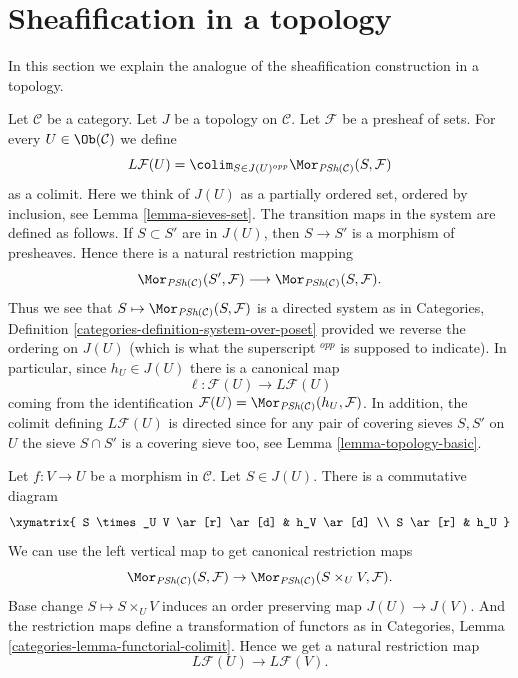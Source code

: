 \section{Sheafification in a topology}
\label{section-sheafification-topology}

\noindent
In this section we explain the analogue of the
sheafification construction in a topology.

\medskip\noindent
Let $\mathcal{C}$ be a category.
Let $J$ be a topology on $\mathcal{C}$.
Let $\mathcal{F}$ be a presheaf of sets.
For every $U \in \Ob(\mathcal{C})$ we
define
$$
L\mathcal{F}(U)
=
\colim_{S \in J(U)^{opp}}
\Mor_{\textit{PSh}(\mathcal{C})}(S, \mathcal{F})
$$
as a colimit. Here we think of $J(U)$ as a partially ordered set,
ordered by inclusion, see Lemma \ref{lemma-sieves-set}. The transition
maps in the system are defined as follows.
If $S \subset S'$ are in $J(U)$, then $S \to S'$ is
a morphism of presheaves. Hence there is a natural restriction
mapping
$$
\Mor_{\textit{PSh}(\mathcal{C})}(S', \mathcal{F})
\longrightarrow
\Mor_{\textit{PSh}(\mathcal{C})}(S, \mathcal{F}).
$$
Thus we see that
$S \mapsto \Mor_{\textit{PSh}(\mathcal{C})}(S, \mathcal{F})$
is a directed system as in Categories,
Definition \ref{categories-definition-system-over-poset}
provided we reverse the ordering
on $J(U)$ (which is what the superscript ${}^{opp}$ is supposed to
indicate). In particular, since $h_U \in J(U)$
there is a canonical map
$$
\ell : \mathcal{F}(U) \longrightarrow L\mathcal{F}(U)
$$
coming from the identification
$\mathcal{F}(U) = \Mor_{\textit{PSh}(\mathcal{C})}(h_U, \mathcal{F})$.
In addition, the colimit defining $L\mathcal{F}(U)$ is directed
since for any pair of covering sieves $S, S'$ on $U$ the
sieve $S \cap S'$ is a covering sieve too, see Lemma \ref{lemma-topology-basic}.

\medskip\noindent
Let $f : V \to U$ be a morphism in $\mathcal{C}$.
Let $S \in J(U)$. There is a commutative diagram
$$
\xymatrix{
S \times_U V \ar[r] \ar[d] & h_V \ar[d] \\
S \ar[r] & h_U
}
$$
We can use the left vertical map to get canonical restriction maps
$$
\Mor_{\textit{PSh}(\mathcal{C})}(S, \mathcal{F})
\to \Mor_{\textit{PSh}(\mathcal{C})}(S \times_U V, \mathcal{F}).
$$
Base change $S \mapsto S \times_U V$ induces an order
preserving map $J(U) \to J(V)$. And the restriction maps
define a transformation of functors as in
Categories, Lemma \ref{categories-lemma-functorial-colimit}.
Hence we get a natural restriction map
$$
L\mathcal{F}(U) \longrightarrow L\mathcal{F}(V).
$$

